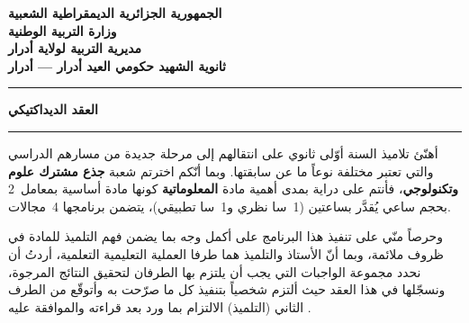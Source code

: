 \documentclass[12pt, a4paper]{article}
\begin{document}
\begin{center}

  \begin{headerbox}
    \centering
    \large
    \textbf{الجمهورية الجزائرية الديمقراطية الشعبية} \\[6pt]
    \textbf{وزارة التربية الوطنية} \\[6pt]
    \textbf{مديرية التربية لولاية أدرار} \\[6pt]
    \textbf{ثانوية الشهيد حكومي العيد أدرار — أدرار}
  \end{headerbox}

  \vspace{1cm}

  {\color{secondary}\rule{\textwidth}{2pt}}

  \vspace{0.6cm}

  {\Huge\bfseries\color{primary} العقد الديداكتيكي}


  {\color{secondary}\rule{\textwidth}{2pt}}

  \vspace{0.8cm}

\end{center}

\begin{contractbox}[التمهيد]
  أهنّئ تلاميذ السنة أوّلى ثانوي على انتقالهم إلى مرحلة جديدة من مسارهم
  الدراسي والتي تعتبر مختلفة نوعاً ما عن سابقتها. وبما أنّكم اخترتم شعبة
  \textbf{جذع مشترك علوم وتكنولوجي}، فأنتم على دراية بمدى أهمية مادة
  \textbf{المعلوماتية} كونها مادة أساسية بمعامل~2 بحجم ساعي يُقدَّر
  بساعتين (1~سا نظري و1~سا تطبيقي)، يتضمن برنامجها 4~مجالات.


  وحرصاً منّي على تنفيذ هذا البرنامج على أكمل وجه بما يضمن فهم التلميذ
  للمادة في ظروف ملائمة، وبما أنّ الأستاذ والتلميذ هما طرفا العملية
  التعليمية التعلمية، أردتُ أن نحدد مجموعة الواجبات التي يجب أن يلتزم بها
  الطرفان لتحقيق النتائج المرجوة، ونسجّلها في هذا العقد حيث ألتزم شخصياً
  بتنفيذ كل ما صرّحت به وأتوقّع من الطرف الثاني (التلميذ) الالتزام بما
  ورد بعد قراءته والموافقة عليه .
\end{contractbox}
\end{document}
